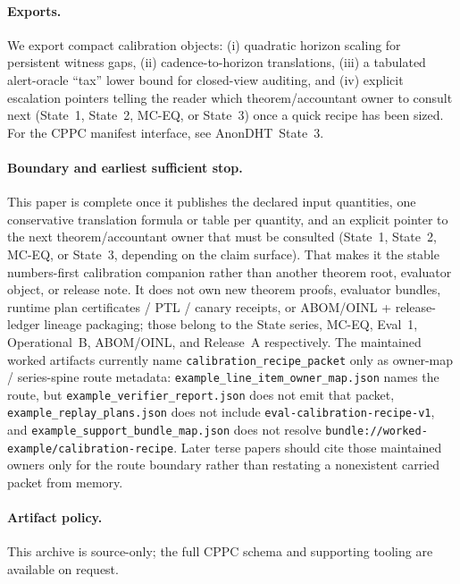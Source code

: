 \documentclass[11pt]{article}
\begin{document}
\paragraph{Exports.}
We export compact calibration objects: (i) quadratic horizon scaling for persistent witness gaps, (ii) cadence-to-horizon translations, (iii) a tabulated alert-oracle ``tax'' lower bound for closed-view auditing, and (iv) explicit escalation pointers telling the reader which theorem/accountant owner to consult next (State~1, State~2, MC-EQ, or State~3) once a quick recipe has been sized.
For the CPPC manifest interface, see AnonDHT~State~3.\cite{state3}

\paragraph{Boundary and earliest sufficient stop.}
This paper is complete once it publishes the declared input quantities, one conservative translation formula or table per quantity, and an explicit pointer to the next theorem/accountant owner that must be consulted (State~1, State~2, MC-EQ, or State~3, depending on the claim surface).
That makes it the stable numbers-first calibration companion rather than another theorem root, evaluator object, or release note. It does not own new theorem proofs, evaluator bundles, runtime plan certificates / PTL / canary receipts, or ABOM/OINL + release-ledger lineage packaging; those belong to the State series, MC-EQ, Eval~1, Operational~B, ABOM/OINL, and Release~A respectively. The maintained worked artifacts currently name \nolinkurl{calibration_recipe_packet} only as owner-map / series-spine route metadata: \nolinkurl{example_line_item_owner_map.json} names the route, but \nolinkurl{example_verifier_report.json} does not emit that packet, \nolinkurl{example_replay_plans.json} does not include \nolinkurl{eval-calibration-recipe-v1}, and \nolinkurl{example_support_bundle_map.json} does not resolve \nolinkurl{bundle://worked-example/calibration-recipe}. Later terse papers should cite those maintained owners only for the route boundary rather than restating a nonexistent carried packet from memory.\cite{state1,state2,state3,series:mceq,series:eval1,series:opB,series:abom,series:releaseproperty,series:workedexample,series:seriesspines}

\paragraph{Artifact policy.}
This archive is source-only; the full CPPC schema and supporting tooling are available on request.\cite{series:artifactpolicy}
\end{document}
